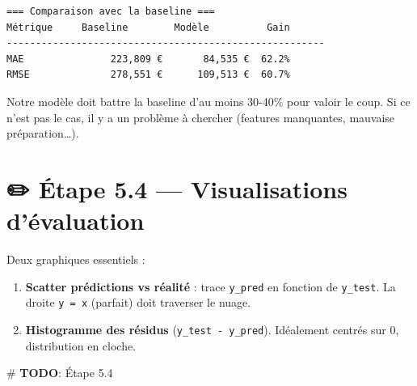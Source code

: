 \documentclass[
  french,
  11pt,
  a4paper,
]{scrbook}
\newenvironment{Shaded}{}{}
\newcommand{\AlertTok}[1]{\textcolor[rgb]{1.00,0.33,0.33}{\textbf{#1}}}
\newcommand{\CommentTok}[1]{\textcolor[rgb]{0.42,0.45,0.49}{#1}}
\providecommand{\tightlist}{%
  \setlength{\itemsep}{0pt}\setlength{\parskip}{0pt}}
\begin{document}
\begin{tcolorbox}
\begin{verbatim}
=== Comparaison avec la baseline ===
Métrique     Baseline        Modèle          Gain      
-------------------------------------------------------
MAE               223,809 €       84,535 €  62.2%
RMSE              278,551 €      109,513 €  60.7%
\end{verbatim}

Notre modèle doit battre la baseline d'au moins 30-40\% pour valoir le
coup. Si ce n'est pas le cas, il y a un problème à chercher (features
manquantes, mauvaise préparation\ldots).

\end{tcolorbox}

\section{✏️ Étape 5.4 --- Visualisations
d'évaluation}\label{uxe9tape-5.4-visualisations-duxe9valuation}

\begin{tcolorbox}[enhanced jigsaw, arc=.35mm, bottomrule=.15mm, bottomtitle=1mm, breakable, colback=white, colbacktitle=quarto-callout-note-color!10!white, colframe=quarto-callout-note-color-frame, coltitle=black, left=2mm, leftrule=.75mm, opacityback=0, opacitybacktitle=0.6, rightrule=.15mm, title={📝 À faire}, titlerule=0mm, toprule=.15mm, toptitle=1mm]

Deux graphiques essentiels :

\begin{enumerate}
\def\labelenumi{\arabic{enumi}.}
\tightlist
\item
  \textbf{Scatter prédictions vs réalité} : trace \texttt{y\_pred} en
  fonction de \texttt{y\_test}. La droite \texttt{y\ =\ x} (parfait)
  doit traverser le nuage.
\item
  \textbf{Histogramme des résidus} (\texttt{y\_test\ -\ y\_pred}).
  Idéalement centrés sur 0, distribution en cloche.
\end{enumerate}

\end{tcolorbox}

\begin{Shaded}
\begin{Highlighting}[]
\CommentTok{\# }\AlertTok{TODO}\CommentTok{: Étape 5.4}
\end{Highlighting}
\end{Shaded}
\end{document}
